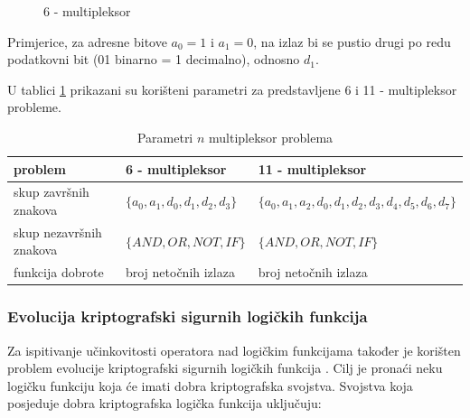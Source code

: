 \begin{figure}[H]
\centering


\caption{6 - multipleksor}
  \label{muxPicture}
\end{figure}

Primjerice, za adresne bitove $a_0=1$ i $a_1=0$, na izlaz bi se pustio drugi po redu podatkovni bit (01 binarno = 1 decimalno), odnosno $d_1$.

U tablici \ref{muxTable} prikazani su korišteni parametri za predstavljene 6 i 11 - multipleksor probleme.

\begin{table}[H]
 	\centering
    \caption{Parametri $n$ multipleksor problema}
    \begin{tabular}{| l | l | l |}
    \hline
   problem & 6 - multipleksor & 11 - multipleksor \\ \hline
   skup završnih znakova & $\{a_0, a_1, d_0, d_1, d_2, d_3 \}$ & $\{a_0, a_1, a_2, d_0, d_1, d_2, d_3, d_4, d_5, d_6, d_7 \}$\\ \hline
   skup nezavršnih znakova & $\{ AND, OR, NOT, IF \}$  & $\{ AND, OR, NOT, IF \}$ \\ \hline
   funkcija dobrote & broj netočnih izlaza & broj netočnih izlaza \\ \hline
    \end{tabular}
    

    \label{muxTable}
\end{table}

\subsubsection{Evolucija kriptografski sigurnih logičkih funkcija}
Za ispitivanje učinkovitosti operatora nad logičkim funkcijama također je korišten problem evolucije kriptografski sigurnih logičkih funkcija \cite{bool}. Cilj je pronaći neku logičku funkciju koja će imati dobra kriptografska svojstva. Svojstva koja posjeduje dobra kriptografska logička funkcija uključuju:

